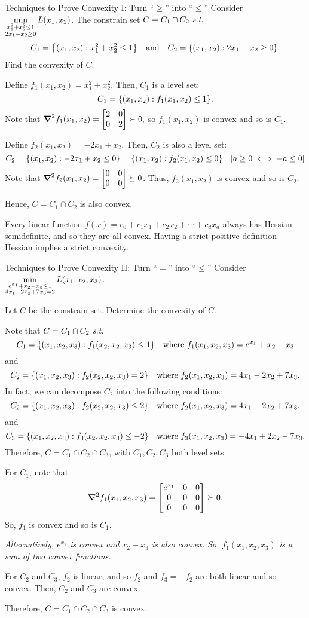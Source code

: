 \begin{eg}{Techniques to Prove Convexity I: Turn ``$\geq$'' into ``$\leq$''}
	Consider $\displaystyle\min_{\substack{x_1^2+x_2^2\leq1\\2x_1-x_2\geq0}} L(x_1,x_2)$. The constrain set $C=C_1\cap C_2\emph{\ s.t.\ }$ \[C_1=\qty{(x_1,x_2):x_1^2+x_2^2\leq1}\quad\text{and}\quad C_2=\qty{(x_1,x_2):2x_1-x_2\geq0}.\] Find the convexity of $C$. 
	\begin{sol}
		Define $f_1(x_1,x_2)=x_1^2+x_2^2$. Then, $C_1$ is a level set: \[C_1=\qty{(x_1,x_2):f_1(x_1,x_2)\leq1}.\] Note that $\grad^2f_1(x_1,x_2)=\mqty[2&0\\0&2]\succ0,$ so $f_1(x_1,x_2)$ is convex and so is $C_1$.\par 
		Define $f_2(x_1,x_2)=-2x_1+x_2$. Then, $C_2$ is also a level set: \[C_2=\qty{(x_1,x_2):-2x_1+x_2\leq0}=\qty{(x_1,x_2):f_2(x_1,x_2)\leq0}\quad [a\geq0\iff -a\leq0]\] Note that $\grad^2f_2(x_1,x_2)=\mqty[0&0\\0&0]\succeq0$. Thus, $f_2(x_1,x_2)$ is convex and so is $C_2$.\par Hence, $C=C_1\cap C_2$ is also convex. 
	\end{sol}
\end{eg}
\begin{rmk}
	Every linear function $f(x)=c_0+c_1x_1+c_2x_2+\cdots+c_dx_d$ always has Hessian semidefinite, and so they are all convex. Having a strict positive definition Hessian implies a strict convexity. 	
\end{rmk}
\begin{eg}{Techniques to Prove Convexity II: Turn ``$=$'' into ``$\leq$''}
	Consider $\displaystyle\min_{\substack{e^{x_1}+x_2-x_3\leq1\\4x_1-2x_2+7x_3=2}}L(x_1,x_2,x_3)$.\par Let $C$ be the constrain set. Determine the convexity of $C$. 
	\begin{sol}
		Note that $C=C_1\cap C_2\emph{\ s.t.\ }$ \[C_1=\qty{(x_1,x_2,x_3):f_1(x_2,x_2,x_3)\leq1}\quad\text{where }f_1(x_1,x_2,x_3)=e^{x_1}+x_2-x_3\] and  \[C_2=\qty{(x_1,x_2,x_3):f_2(x_2,x_2,x_3)=2}\quad\text{where }f_2(x_1,x_2,x_3)=4x_1-2x_2+7x_3.\] In fact, we can decompose $C_2$ into the following conditions: \[C_2=\qty{(x_1,x_2,x_3):f_2(x_2,x_2,x_3)\leq2}\quad\text{where }f_2(x_1,x_2,x_3)=4x_1-2x_2+7x_3.\] and \[C_3=\qty{(x_1,x_2,x_3):f_3(x_2,x_2,x_3)\leq-2}\quad\text{where }f_3(x_1,x_2,x_3)=-4x_1+2x_2-7x_3.\] Therefore, $C=C_1\cap C_2\cap C_3$, with $C_1,C_2,C_3$ both level sets.\par 
		 For $C_1$, note that \[\grad^2f_1(x_1,x_2,x_3)=\mqty[e^{x_1}&0&0\\0&0&0\\0&0&0]\succeq0.\] So, $f_1$ is convex and so is $C_1$. \par 
		 \textit{Alternatively, $e^{x_1}$ is convex and $x_2-x_3$ is also convex. So, $f_1(x_1,x_2,x_3)$ is a sum of two convex functions.}\par 
		  For $C_2$ and $C_3$, $f_2$ is linear, and so $f_2$ and $f_3=-f_2$ are both linear and so convex. Then, $C_2$ and $C_3$ are convex.\par 
		   Therefore, $C=C_1\cap C_2\cap C_3$ is convex. 
	\end{sol}
\end{eg}

